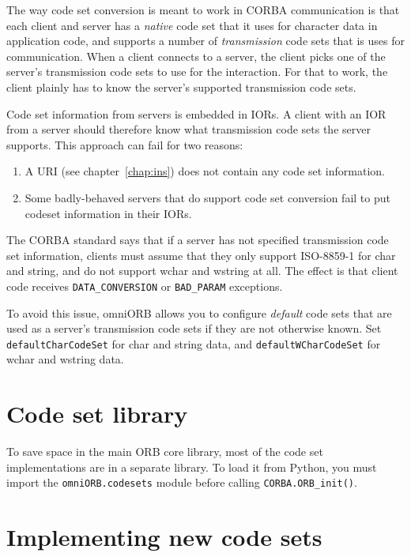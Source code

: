 \documentclass[11pt,oneside,a4paper]{book}
\newcommand{\code}[1]{\texttt{#1}}
\newcommand{\op}[1]{\texttt{#1()}}
\newcommand{\term}[1]{\textit{#1}}
\newcommand{\dsc}{\discretionary{}{}{}}
\begin{document}
The way code set conversion is meant to work in CORBA communication is
that each client and server has a \term{native} code set that it uses
for character data in application code, and supports a number of
\term{transmission} code sets that is uses for communication. When a
client connects to a server, the client picks one of the server's
transmission code sets to use for the interaction. For that to work,
the client plainly has to know the server's supported transmission
code sets.

Code set information from servers is embedded in IORs. A client with
an IOR from a server should therefore know what transmission code sets
the server supports. This approach can fail for two reasons:

\begin{enumerate}
  \item A  URI (see chapter~\ref{chap:ins}) does
    not contain any code set information.

  \item Some badly-behaved servers that do support code set conversion
    fail to put codeset information in their IORs.
\end{enumerate}

The CORBA standard says that if a server has not specified
transmission code set information, clients must assume that they only
support ISO-8859-1 for char and string, and do not support wchar and
wstring at all. The effect is that client code receives
\code{DATA\_CONVERSION} or \code{BAD\_PARAM} exceptions.

To avoid this issue, omniORB allows you to configure \term{default}
code sets that are used as a server's transmission code sets if they
are not otherwise known. Set \code{defaultCharCodeSet} for char and
string data, and \code{defaultWCharCodeSet} for wchar and wstring data.


\section{Code set library}

To save space in the main ORB core library, most of the code set
implementations are in a separate library. To load it from Python, you
must import the \code{omniORB.\dsc{}codesets} module before calling
\op{CORBA.ORB\_init}.


\section{Implementing new code sets}
\end{document}
